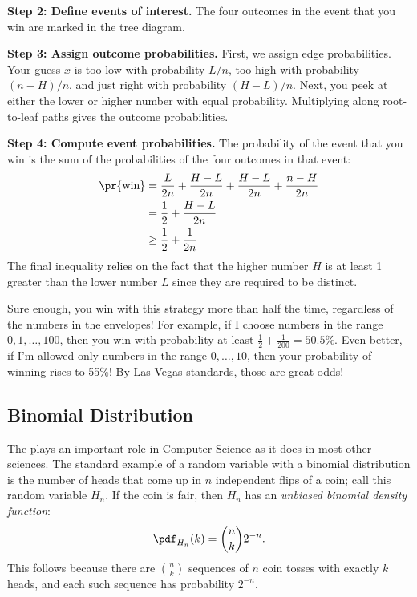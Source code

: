 \noindent \textbf{Step 2: Define events of interest. } The four
outcomes in the event that you win are marked in the tree diagram.

\noindent \textbf{Step 3: Assign outcome probabilities. } First, we
assign edge probabilities.  Your guess $x$ is too low with probability
$L/n$, too high with probability $(n-H)/n$, and just right with
probability $(H-L)/n$.  Next, you peek at either the lower or higher
number with equal probability.  Multiplying along root-to-leaf paths
gives the outcome probabilities.

\noindent \textbf{Step 4: Compute event probabilities. }  The
probability of the event that you win is the sum of the probabilities
of the four outcomes in that event:
%
\begin{align*}
\pr{\text{win}}
    & = \frac{L}{2n} + \frac{H-L}{2n} + \frac{H-L}{2n}  + \frac{n-H}{2n} \\
    & = \frac{1}{2} + \frac{H-L}{2n} \\
    & \geq \frac{1}{2} + \frac{1}{2n}
\end{align*}
%
The final inequality relies on the fact that the higher number $H$ is
at least 1 greater than the lower number $L$ since they are required
to be distinct.

Sure enough, you win with this strategy more than half the time,
regardless of the numbers in the envelopes!  For example, if I choose
numbers in the range $0, 1, \dots, 100$, then you win with probability at
least $\frac{1}{2} + \frac{1}{200} = 50.5\%$.  Even better, if I'm allowed
only numbers in the range $0, \dots, 10$, then your probability of
winning rises to 55\%!  By Las Vegas standards, those are great odds!


\subsection{Binomial Distribution}\label{binomial_distribution_section}

The  plays an important role in Computer
Science as it does in most other sciences.  The standard example of a
random variable with a binomial distribution is the number of heads that
come up in $n$ independent flips of a coin; call this random variable
$H_n$.  If the coin is fair, then $H_n$ has an \textit{unbiased binomial
  density function}:
%
\[
\pdf_{H_n}(k) = \binom{n}{k} 2^{-n}.
\]
%
This follows because there are $\binom{n}{k}$ sequences of $n$ coin
tosses with exactly $k$ heads, and each such sequence has probability
$2^{-n}$.

